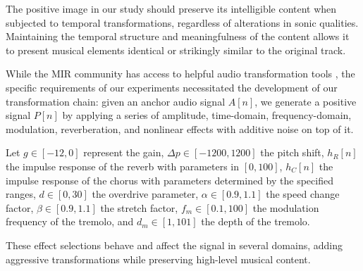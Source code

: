 The positive image in our study should preserve its intelligible content when subjected to temporal transformations, regardless of alterations in sonic qualities. Maintaining the temporal structure and meaningfulness of the content allows it to present musical elements identical or strikingly similar to the original track.

While the MIR community has access to helpful audio transformation tools \cite{Spijkervet2021Spijkervet/torchaudio-augmentations:V1.0}, the specific requirements of our experiments necessitated the development of our transformation chain: given an anchor audio signal $A[n]$, we generate a positive signal $P[n]$ by applying a series of amplitude, time-domain, frequency-domain, modulation, reverberation, and nonlinear effects with additive noise on top of it. 

Let $g \in [-12, 0]$ represent the gain, $\Delta p \in [-1200, 1200]$ the pitch shift, $h_R[n]$ the impulse response of the reverb with parameters in $[0, 100]$, $h_C[n]$ the impulse response of the chorus with parameters determined by the specified ranges, $d \in [0, 30]$ the overdrive parameter, $\alpha \in [0.9, 1.1]$ the speed change factor, $\beta \in [0.9, 1.1]$ the stretch factor, $f_m \in [0.1, 100]$ the modulation frequency of the tremolo, and $d_m \in [1, 101]$ the depth of the tremolo. 

These effect selections behave and affect the signal in several domains, adding aggressive transformations while preserving high-level musical content.

